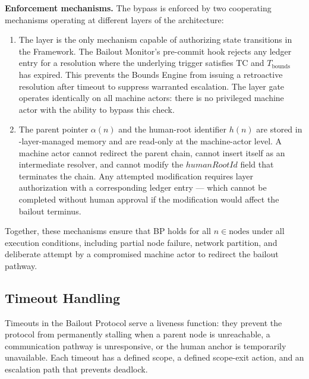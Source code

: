 \bigskip
\noindent\textbf{Enforcement mechanisms.} The bypass is enforced by two cooperating mechanisms operating at different layers of the \bxthree{} architecture:

\begin{enumerate}
\item[\textbf{Fact Layer gate (enforcement at the authorization layer).}] The \fact{} layer is the only mechanism capable of authorizing state transitions in the \bxthree{} Framework. The Bailout Monitor's pre-commit hook rejects any ledger entry for a resolution where the underlying trigger satisfies TC and $T_{\text{bounds}}$ has expired. This prevents the Bounds Engine from issuing a retroactive resolution after timeout to suppress warranted escalation. The \fact{} layer gate operates identically on all machine actors: there is no privileged machine actor with the ability to bypass this check.

\item[\textbf{Immutable parent-pointer and human-root architecture (enforcement at the data model layer).}] The parent pointer $\alpha(n)$ and the human-root identifier $h(n)$ are stored in \fact-layer-managed memory and are read-only at the machine-actor level. A machine actor cannot redirect the parent chain, cannot insert itself as an intermediate resolver, and cannot modify the $humanRootId$ field that terminates the chain. Any attempted modification requires \purpose{} layer authorization with a corresponding ledger entry --- which cannot be completed without human approval if the modification would affect the bailout terminus.
\end{enumerate}

Together, these mechanisms ensure that BP holds for all $n \in \text{nodes}$ under all execution conditions, including partial node failure, network partition, and deliberate attempt by a compromised machine actor to redirect the bailout pathway.

\subsection{Timeout Handling}\label{sec:timeout-handling}

Timeouts in the Bailout Protocol serve a liveness function: they prevent the protocol from permanently stalling when a parent node is unreachable, a communication pathway is unresponsive, or the human anchor is temporarily unavailable. Each timeout has a defined scope, a defined scope-exit action, and an escalation path that prevents deadlock.

